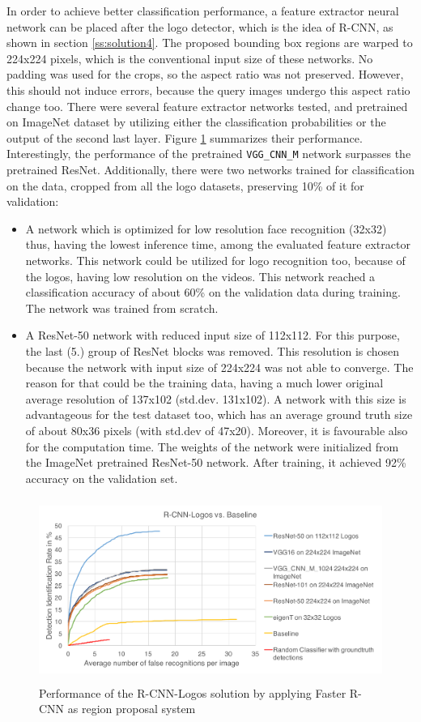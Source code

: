 In order to achieve better classification performance, a feature extractor neural network can be placed after the logo detector, which is the idea of R-CNN, as shown in section \ref{ss:solution4}. The proposed bounding box regions are warped to 224x224 pixels, which is the conventional input size of these networks. No padding was used for the crops, so the aspect ratio was not preserved. However, this should not induce errors, because the query images undergo this aspect ratio change too. There were several feature extractor networks tested, and pretrained on ImageNet dataset by utilizing either the classification probabilities or the output of the second last layer. Figure \ref{f:sol4} summarizes their performance. Interestingly, the performance of the pretrained \texttt{VGG\_CNN\_M} network surpasses the pretrained ResNet. Additionally, there were two networks trained for classification on the data, cropped from all the logo datasets, preserving 10\% of it for validation:
\begin{itemize}
    \item A network \cite{ies_2016_herrmann_video_face_recognition} which is optimized for low resolution face recognition (32x32) thus, having the lowest inference time, among the evaluated feature extractor networks. This network could be utilized for logo recognition too, because of the logos, having low resolution on the videos. This network reached a classification accuracy of about 60\% on the validation data during training. The network was trained from scratch.
    \item A ResNet-50 network with reduced input size of 112x112. For this purpose, the last (5.) group of ResNet blocks was removed. This resolution is chosen because the network with input size of 224x224 was not able to converge. The reason for that could be the training data, having a much lower original average resolution of 137x102 (std.dev. 131x102). A network with this size is advantageous for the test dataset too, which has an average ground truth size of about 80x36 pixels (with std.dev of 47x20). Moreover, it is favourable also for the computation time. The weights of the network were initialized from the ImageNet pretrained ResNet-50 network. After training, it achieved 92\% accuracy on the validation set.
\end{itemize}
\begin{figure}
  \centering
  \includegraphics[height=60mm]{images/mt/sol4.pdf}
  \caption{Performance of the R-CNN-Logos solution by applying Faster R-CNN as region proposal system}
  \label{f:sol4}
\end{figure}


